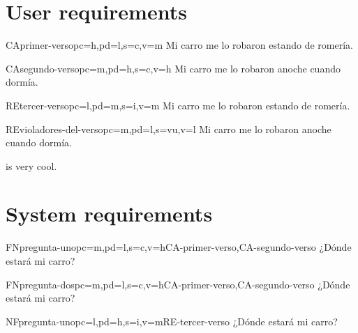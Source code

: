 \documentclass[a4paper,10pt]{article}
\begin{document}
  \section{User requirements}

  \printureqtemplate

  \begin{userReq}{CA}{primer-verso}{pc=h,pd=l,s=c,v=m}
    Mi carro me lo robaron estando de romería.
  \end{userReq}

  \begin{userReq}{CA}{segundo-verso}{pc=m,pd=h,s=c,v=h}
    Mi carro me lo robaron anoche cuando dormía.
  \end{userReq}

  \begin{userReq}{RE}{tercer-verso}{pc=l,pd=m,s=i,v=m}
    Mi carro me lo robaron estando de romería.
  \end{userReq}

  \begin{userReq}{RE}{violadores-del-verso}{pc=m,pd=l,s=vu,v=l}
    Mi carro me lo robaron anoche cuando dormía.
  \end{userReq}

  \FloatBarrier

   is very cool.



  \section{System requirements}

  \printsreqtemplate

  \begin{softwareReq}{FN}{pregunta-uno}{pc=m,pd=l,s=c,v=h}{CA-primer-verso,CA-segundo-verso}
    ¿Dónde estará mi carro?
  \end{softwareReq}

  \begin{softwareReq}{FN}{pregunta-dos}{pc=m,pd=l,s=c,v=h}{CA-primer-verso,CA-segundo-verso}
    ¿Dónde estará mi carro?
  \end{softwareReq}

  \begin{softwareReq}{NF}{pregunta-uno}{pc=l,pd=h,s=i,v=m}{RE-tercer-verso}
    ¿Dónde estará mi carro?
  \end{softwareReq}
\end{document}
